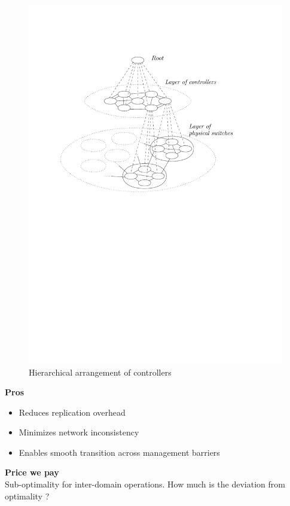 \documentclass[portrait,a1]{a0poster}
\begin{document}
\begin{multicols}{2}
\begin{figure}[H]
\centering
\includegraphics[scale=1.9]{hierarchy}
\caption{Hierarchical arrangement of controllers}
\label{fig:hierarchy}
\end{figure}


\textbf{Pros}
\begin{itemize}
    \item Reduces replication overhead
    \item Minimizes network inconsistency
    \item Enables smooth transition across management barriers
\end{itemize}
\textbf{Price we pay}  \\
Sub-optimality for inter-domain operations. How much is the deviation from optimality ?







\end{multicols}
\end{document}
